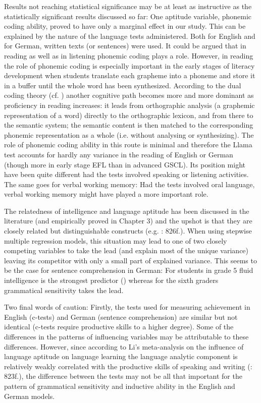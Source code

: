 \documentclass[output=paper]{langsci/langscibook}
\begin{document}
Results not reaching statistical significance may be at least as instructive as the statistically significant results discussed so far: One aptitude variable, phonemic coding ability, proved to have only a marginal effect in our study. This can be explained by the nature of the language tests administered. Both for English and for German, written texts (or sentences) were used. It could be argued that in reading as well as in listening phonemic coding plays a role. However, in reading the role of phonemic coding is especially important in the early stages of literacy development when students translate each grapheme into a phoneme and store it in a buffer until the whole word has been synthesized. According to the dual coding theory (cf. \citealt{ColtheartEtAl2001}) another cognitive path becomes more and more dominant as proficiency in reading increases: it leads from orthographic analysis (a graphemic representation of a word) directly to the orthographic lexicon, and from there to the semantic system; the semantic content is then matched to the corresponding phonemic representation as a whole (i.e. without analysing or synthesizing). The role of phonemic coding ability in this route is minimal and therefore the Llama test accounts for hardly any variance in the reading of English or German (though more in early stage EFL than in advanced GSCL). Its position might have been quite different had the tests involved speaking or listening activities. The same goes for verbal working memory: Had the tests involved oral language, verbal working memory might have played a more important role. 

The relatedness of intelligence and language aptitude has been discussed in the literature (and empirically proved in Chapter 3) and the upshot is that they are closely related but distinguishable constructs (e.g. \citealt{Li2016}: 826f.). When using stepwise multiple regression models, this situation may lead to one of two closely competing variables to take the lead (and explain most of the unique variance) leaving its competitor with only a small part of explained variance. This seems to be the case for sentence comprehension in German: For students in grade 5 fluid intelligence is the strongest predictor () whereas for the sixth graders grammatical sensitivity takes the lead.

Two final words of caution: Firstly, the tests used for measuring achievement in English (c-tests) and German (sentence comprehension) are similar but not identical (c-tests require productive skills to a higher degree). Some of the differences in the patterns of influencing variables may be attributable to these differences. However, since according to Li’s meta-analysis on the influence of language aptitude on language learning the language analytic component is relatively weakly correlated with the productive skills of speaking and writing (\citealt{Li2016}: 823f.), the difference between the tests may not be all that important for the pattern of grammatical sensitivity and inductive ability in the English and German models.
\end{document}
